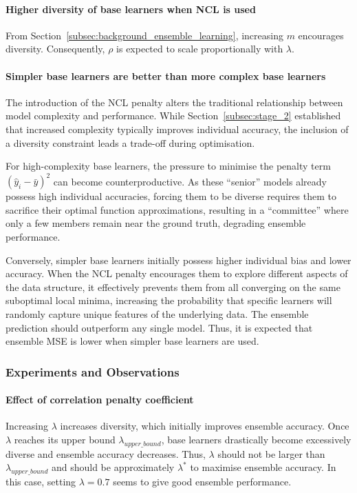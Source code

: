 \paragraph{Higher diversity of base learners when NCL is used}
From Section~\ref{subsec:background_ensemble_learning}, increasing $m$ encourages diversity. Consequently, $\rho$ is expected to scale proportionally with $\lambda$. 

\paragraph{Simpler base learners are better than more complex base learners}
The introduction of the NCL penalty alters the traditional relationship between model complexity and performance. While Section~\ref{subsec:stage_2} established that increased complexity typically improves individual accuracy, the inclusion of a diversity constraint leads a trade-off during optimisation. 

For high-complexity base learners, the pressure to minimise the penalty term $(\hat{y}_i - \bar{y})^2$ can become counterproductive. As these ``senior'' models already possess high individual accuracies, forcing them to be diverse requires them to sacrifice their optimal function approximations, resulting in a ``committee'' where only a few members remain near the ground truth, degrading ensemble performance. 

Conversely, simpler base learners initially possess higher individual bias and lower accuracy. When the NCL penalty encourages them to explore different aspects of the data structure, it effectively prevents them from all converging on the same suboptimal local minima, increasing the probability that specific learners will randomly capture unique features of the underlying data. The ensemble prediction should outperform any single model. Thus, it is expected that ensemble MSE is lower when simpler base learners are used. 


\subsubsection{Experiments and Observations}
\label{subsubsec:evaluation_ncl_observations}
\paragraph{Effect of correlation penalty coefficient}
Increasing $\lambda$ increases diversity, which initially improves ensemble accuracy. Once $\lambda$ reaches its upper bound $\lambda_{upper\_bound}$, base learners drastically become excessively diverse and ensemble accuracy decreases. Thus, $\lambda$ should not be larger than $\lambda_{upper\_bound}$ and should be approximately $\lambda^*$ to maximise ensemble accuracy. In this case, setting $\lambda = 0.7$ seems to give good ensemble performance. 

